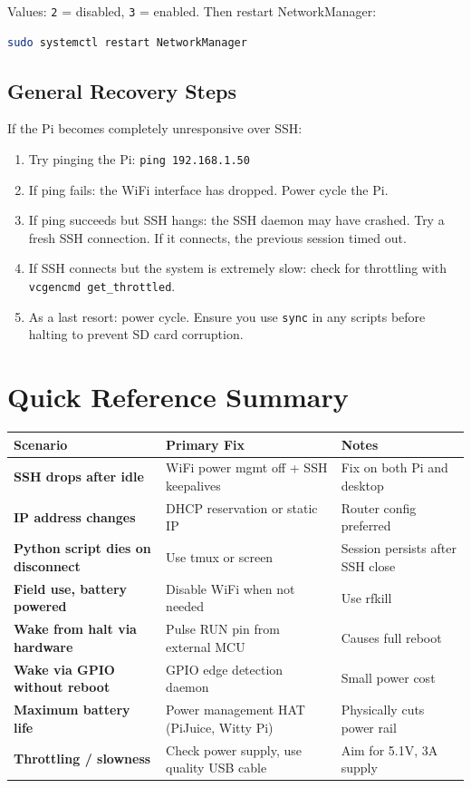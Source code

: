 \documentclass[11pt,letter]{article}
\begin{document}
Values: \texttt{2} = disabled, \texttt{3} = enabled. Then restart NetworkManager:
\begin{lstlisting}[language=bash]
sudo systemctl restart NetworkManager
\end{lstlisting}

\subsection{General Recovery Steps}

If the Pi becomes completely unresponsive over SSH:

\begin{enumerate}
  \item Try pinging the Pi: \texttt{ping 192.168.1.50}
  \item If ping fails: the WiFi interface has dropped. Power cycle the Pi.
  \item If ping succeeds but SSH hangs: the SSH daemon may have crashed. Try a fresh SSH connection. If it connects, the previous session timed out.
  \item If SSH connects but the system is extremely slow: check for throttling with \texttt{vcgencmd get\_throttled}.
  \item As a last resort: power cycle. Ensure you use \texttt{sync} in any scripts before halting to prevent SD card corruption.
\end{enumerate}

\section{Quick Reference Summary}

\begin{center}
\begin{tabular}{>{\bfseries}p{4.5cm} p{5cm} p{4.5cm}}
\toprule
\textbf{Scenario} & \textbf{Primary Fix} & \textbf{Notes} \\
\midrule
SSH drops after idle & WiFi power mgmt off + SSH keepalives & Fix on both Pi and desktop \\
IP address changes & DHCP reservation or static IP & Router config preferred \\
Python script dies on disconnect & Use tmux or screen & Session persists after SSH close \\
Field use, battery powered & Disable WiFi when not needed & Use rfkill \\
Wake from halt via hardware & Pulse RUN pin from external MCU & Causes full reboot \\
Wake via GPIO without reboot & GPIO edge detection daemon & Small power cost \\
Maximum battery life & Power management HAT (PiJuice, Witty Pi) & Physically cuts power rail \\
Throttling / slowness & Check power supply, use quality USB cable & Aim for 5.1V, 3A supply \\
\bottomrule
\end{tabular}
\end{center}
\end{document}
